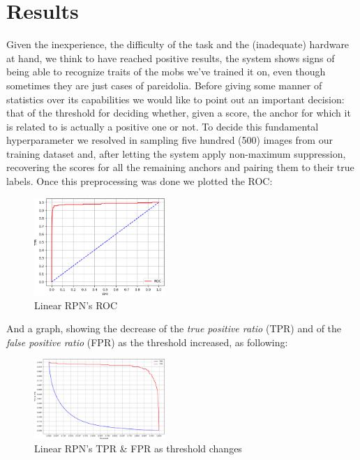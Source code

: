 \documentclass[10pt,journal,cspaper,compsoc]{IEEEtran}
\begin{document}
    \section{Results}
    Given the inexperience, the difficulty of the task and the (inadequate) hardware at hand, we think to have reached positive results, the system shows signs of being able to recognize traits of the mobs we've trained it on, even though sometimes they are just cases of pareidolia. Before giving some manner of statistics over its capabilities we would like to point out an important decision: that of the threshold for deciding whether, given a score, the anchor for which it is related to is actually a positive one or not. To decide this fundamental hyperparameter we resolved in sampling five hundred (500) images from our training dataset and, after letting the system apply non-maximum suppression, recovering the scores for all the remaining anchors and pairing them to their true labels. Once this preprocessing was done we plotted the ROC:

    \begin{figure}[h]
        \centering
        \includegraphics[width=0.44\textwidth]{images/ROC.png}
        \caption{Linear RPN's ROC}
    \end{figure}

    And a graph, showing the decrease of the \emph{true positive ratio} (TPR) and of the \emph{false positive ratio} (FPR) as the threshold increased, as following:

    \begin{figure}[h]
        \centering
        \includegraphics[width=0.44\textwidth]{images/threshold_decision.png}
        \caption{Linear RPN's TPR \& FPR as threshold changes}
    \end{figure}
\end{document}
